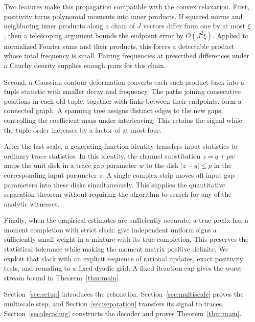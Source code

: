\documentclass[11pt]{article}
\numberwithin{equation}{section}
\theoremstyle{definition}
\theoremstyle{remark}
\begin{document}
Two features make this propagation compatible with the convex
relaxation. First, positivity turns polynomial moments into inner
products. If squared norms and neighboring inner products along a
chain of $J$ vectors differ from one by at most $\xi$, then a telescoping
argument bounds the endpoint error by $O(J^2\xi)$. Applied to normalized
Fourier sums and their products, this forces a detectable product whose
total frequency is small. Pairing frequencies at prescribed differences
under a Cauchy density supplies enough pairs for this chain.

Second, a Gaussian contour deformation converts each such product back
into a tuple statistic with smaller decay and frequency. The paths joining
consecutive positions in each old tuple, together with links between their
endpoints, form a connected graph.
A spanning tree assigns distinct edges to the new gaps, controlling
the coefficient mass under interleaving. This retains the signal while
the tuple order increases by a factor of at most four.

After the last scale, a generating-function identity transfers input
statistics to ordinary trace statistics. In this identity, the channel
substitution $z=q+pw$ maps the unit disk in a trace gap parameter $w$
to the disk $|z-q|\le p$ in the corresponding input parameter $z$.
A single complex strip moves all input gap parameters into these disks
simultaneously.
This supplies the quantitative separation theorem without requiring
the algorithm to search for any of the analytic witnesses.

Finally, when the empirical estimates are sufficiently accurate, a true
prefix has a moment completion with strict slack: give
independent uniform signs a sufficiently small weight in a mixture with
its true completion. This preserves the statistical tolerance while making
the moment matrix positive definite. We exploit that
slack with an explicit sequence of rational updates, exact positivity
tests, and rounding to a fixed dyadic grid. A fixed iteration cap gives
the worst-stream bound in Theorem~\ref{thm:main}.

Section~\ref{sec:setup} introduces the relaxation.
Section~\ref{sec:multiscale} proves the multiscale step, and
Section~\ref{sec:separation} transfers its signal to traces.
Section~\ref{sec:decoding} constructs the decoder and proves
Theorem~\ref{thm:main}.







\end{document}
